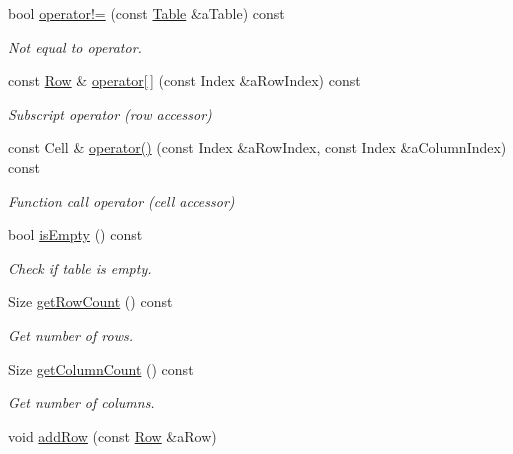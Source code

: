\begin{DoxyCompactItemize}
bool \hyperlink{classlibrary_1_1core_1_1ctnr_1_1_table_ab31f43d4e0081b9d3edd03c22115d17b}{operator!=} (const \hyperlink{classlibrary_1_1core_1_1ctnr_1_1_table}{Table} \&a\+Table) const
\begin{DoxyCompactList}\small\item\em Not equal to operator. \end{DoxyCompactList}\item 
const \hyperlink{classlibrary_1_1core_1_1ctnr_1_1table_1_1_row}{Row} \& \hyperlink{classlibrary_1_1core_1_1ctnr_1_1_table_ae0b163e13fe6dc832c103ca7f89a0ca3}{operator\mbox{[}$\,$\mbox{]}} (const Index \&a\+Row\+Index) const
\begin{DoxyCompactList}\small\item\em Subscript operator (row accessor) \end{DoxyCompactList}\item 
const Cell \& \hyperlink{classlibrary_1_1core_1_1ctnr_1_1_table_a4eb003dcbe4c1c127adf473465e70bef}{operator()} (const Index \&a\+Row\+Index, const Index \&a\+Column\+Index) const
\begin{DoxyCompactList}\small\item\em Function call operator (cell accessor) \end{DoxyCompactList}\item 
bool \hyperlink{classlibrary_1_1core_1_1ctnr_1_1_table_ae0b9f9ee022ed72e06ed41f324855c1a}{is\+Empty} () const
\begin{DoxyCompactList}\small\item\em Check if table is empty. \end{DoxyCompactList}\item 
Size \hyperlink{classlibrary_1_1core_1_1ctnr_1_1_table_a18036491993fea84dd2a595e7703258f}{get\+Row\+Count} () const
\begin{DoxyCompactList}\small\item\em Get number of rows. \end{DoxyCompactList}\item 
Size \hyperlink{classlibrary_1_1core_1_1ctnr_1_1_table_af725ea46d4737e1c3d0d8ad5a4dda733}{get\+Column\+Count} () const
\begin{DoxyCompactList}\small\item\em Get number of columns. \end{DoxyCompactList}\item 
void \hyperlink{classlibrary_1_1core_1_1ctnr_1_1_table_a9c9b8b7a2eca260d58b721c4f465a7d3}{add\+Row} (const \hyperlink{classlibrary_1_1core_1_1ctnr_1_1table_1_1_row}{Row} \&a\+Row)

\end{DoxyCompactItemize}
